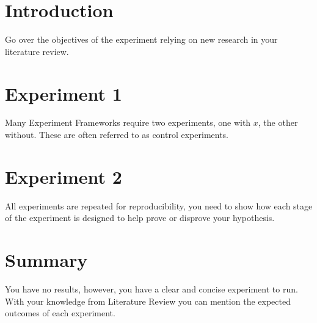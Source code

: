 \section{Introduction}
Go over the objectives of the experiment relying on new research in your literature review. 
\section{Experiment 1}
Many Experiment Frameworks require two experiments, one with $x$, the other without. These are often referred to as control experiments.

\section{Experiment 2}
All experiments are repeated for reproducibility, you need to show how each stage of the experiment is designed to help prove or disprove your hypothesis. 

\section{Summary}
You have no results, however, you have a clear and concise experiment to run. With your knowledge from Literature Review you can mention the expected outcomes of each experiment.


